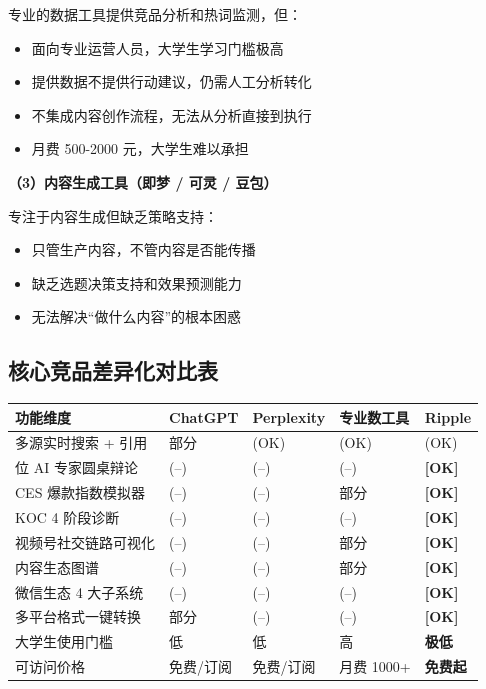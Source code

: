 \documentclass[12pt,a4paper]{ctexart}
\begin{document}
专业的数据工具提供竞品分析和热词监测，但：
\begin{itemize}
  \item 面向专业运营人员，大学生学习门槛极高
  \item 提供数据不提供行动建议，仍需人工分析转化
  \item 不集成内容创作流程，无法从分析直接到执行
  \item 月费 500-2000 元，大学生难以承担
\end{itemize}

\textbf{（3）内容生成工具（即梦 / 可灵 / 豆包）}

专注于内容生成但缺乏策略支持：
\begin{itemize}
  \item 只管生产内容，不管内容是否能传播
  \item 缺乏选题决策支持和效果预测能力
  \item 无法解决``做什么内容''的根本困惑
\end{itemize}

\subsection{核心竞品差异化对比表}

\begin{center}
{\small
\begin{tabular}{>{\raggedright\arraybackslash}p{4.5cm}
                >{\centering\arraybackslash}p{2cm}
                >{\centering\arraybackslash}p{2.5cm}
                >{\centering\arraybackslash}p{2.5cm}
                >{\centering\arraybackslash}p{2cm}}
\toprule
\textbf{功能维度} & \textbf{ChatGPT} & \textbf{Perplexity} & \textbf{专业数工具} & \textbf{Ripple} \\
\midrule
多源实时搜索 + 引用 & 部分 & (OK) & (OK) & (OK) \\[2pt]
7 位 AI 专家圆桌辩论 & (--) & (--) & (--) & \textbf{[OK]} \\[2pt]
CES 爆款指数模拟器 & (--) & (--) & 部分 & \textbf{[OK]} \\[2pt]
KOC 4 阶段诊断 & (--) & (--) & (--) & \textbf{[OK]} \\[2pt]
视频号社交链路可视化 & (--) & (--) & 部分 & \textbf{[OK]} \\[2pt]
内容生态图谱 & (--) & (--) & 部分 & \textbf{[OK]} \\[2pt]
微信生态 4 大子系统 & (--) & (--) & (--) & \textbf{[OK]} \\[2pt]
多平台格式一键转换 & 部分 & (--) & (--) & \textbf{[OK]} \\[2pt]
大学生使用门槛 & 低 & 低 & 高 & \textbf{极低} \\[2pt]
可访问价格 & 免费/订阅 & 免费/订阅 & 月费 1000+ & \textbf{免费起} \\
\bottomrule
\end{tabular}
}
\end{center}
\end{document}
